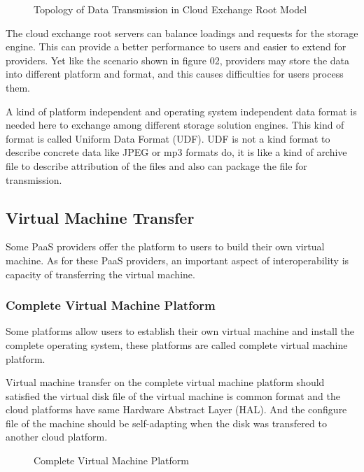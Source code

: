 \documentclass[conference]{IEEEtran}
\begin{document}
\begin{figure}[h]
\centering
{}
\caption{Topology of Data Transmission in Cloud Exchange Root Model}
\label{fig_03}
\end{figure}

The cloud exchange root servers can balance loadings and requests for the storage engine. This can provide a better performance to users and easier to extend for providers. Yet like the scenario shown in figure 02, providers may store the data into different platform and format, and this causes difficulties for users process them.

A kind of platform independent and operating system independent data format is needed here to exchange among different storage solution engines. This kind of format is called Uniform Data Format (UDF). UDF is not a kind format to describe concrete data like JPEG or mp3 formats do, it is like a kind of archive file to describe attribution of the files and also can package the file for transmission.


\subsection{Virtual Machine Transfer}
Some PaaS providers offer the platform to users to build their own virtual machine. As for these PaaS providers, an important aspect of interoperability is capacity of transferring the virtual machine.

\subsubsection{Complete Virtual Machine Platform}
Some platforms allow users to establish their own virtual machine and install the complete operating system, these platforms are called complete virtual machine platform.

Virtual machine transfer on the complete virtual machine platform should satisfied the virtual disk file of the virtual machine is common format and the cloud platforms have same Hardware Abstract Layer (HAL). And the configure file of the machine should be self-adapting when the disk was transfered to another cloud platform.

\begin{figure}[h]
\centering
{}
\caption{Complete Virtual Machine Platform}
\label{fig_04}
\end{figure}
\end{document}
